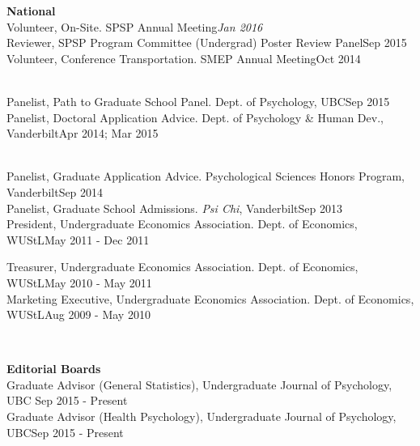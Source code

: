 {\large \textbf{National}}\smallskip\\
Volunteer, On-Site. SPSP Annual Meeting\hfill{\textit{Jan 2016}}\smallskip\\
Reviewer, SPSP Program Committee (Undergrad) Poster Review Panel\hfill{Sep 2015}\smallskip\\
Volunteer, Conference Transportation. SMEP Annual Meeting\hfill{Oct 2014}\medskip\\
\begin{minipage}{\linewidth}\smallskip\\
Panelist, Path to Graduate School Panel. Dept. of Psychology, UBC\hfill {Sep 2015}\smallskip\\
Panelist, Doctoral Application Advice. Dept. of Psychology \& Human Dev., Vanderbilt\hfill {Apr 2014; Mar 2015}\vspace{1.1mm}\end{minipage}\smallskip\\
Panelist, Graduate Application Advice. Psychological Sciences Honors Program, Vanderbilt\hfill {Sep 2014}\smallskip\\
Panelist, Graduate School Admissions. \textit{Psi Chi}, Vanderbilt\hfill {Sep 2013}\smallskip\\
President, Undergraduate Economics Association. Dept. of Economics, WUStL\hfill  {May 2011 - Dec 2011}\smallskip\\
\begin{minipage}{\linewidth}\vspace{1.1mm} Treasurer, Undergraduate Economics Association. Dept. of Economics, WUStL\hfill{May 2010 - May 2011}\smallskip\\
Marketing Executive, Undergraduate Economics Association. Dept. of Economics, WUStL\hfill  {Aug 2009 - May 2010}\end{minipage}\medskip\\
\begin{minipage}{\linewidth}\vspace{1.1mm} {\large \textbf{Editorial Boards}}\\
Graduate Advisor (General Statistics), Undergraduate Journal of Psychology, UBC \hfill{Sep 2015 - Present}\smallskip\\
Graduate Advisor (Health Psychology), Undergraduate Journal of Psychology, UBC\hfill{Sep 2015 - Present}\end{minipage}\medskip\\
